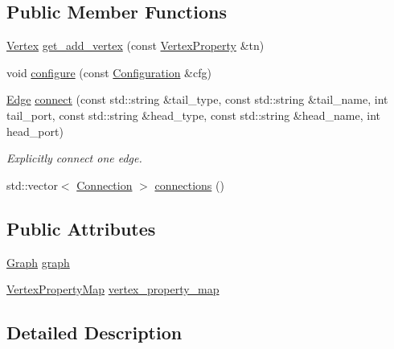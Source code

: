 \subsection*{Public Member Functions}
\begin{DoxyCompactItemize}
\item 
\hyperlink{struct_wire_cell_1_1_dfp_graph_a2f38c4e60540b0b3e530b7b8588f7725}{Vertex} \hyperlink{struct_wire_cell_1_1_dfp_graph_abb2159fd44adc3a08ad127f9ee71c92b}{get\+\_\+add\+\_\+vertex} (const \hyperlink{struct_wire_cell_1_1_dfp_graph_1_1_vertex_property}{Vertex\+Property} \&tn)
\item 
void \hyperlink{struct_wire_cell_1_1_dfp_graph_aa618fc26a6380c93e382a23c64612e77}{configure} (const \hyperlink{namespace_wire_cell_a9f705541fc1d46c608b3d32c182333ee}{Configuration} \&cfg)
\item 
\hyperlink{struct_wire_cell_1_1_dfp_graph_af3fc4fb6130bbad095ffe90480d59998}{Edge} \hyperlink{struct_wire_cell_1_1_dfp_graph_af4a13a365021fdaf75e8aa699bc7262f}{connect} (const std\+::string \&tail\+\_\+type, const std\+::string \&tail\+\_\+name, int tail\+\_\+port, const std\+::string \&head\+\_\+type, const std\+::string \&head\+\_\+name, int head\+\_\+port)
\begin{DoxyCompactList}\small\item\em Explicitly connect one edge. \end{DoxyCompactList}\item 
std\+::vector$<$ \hyperlink{struct_wire_cell_1_1_dfp_graph_a2411a46952a0b08b986e57ce0100ce21}{Connection} $>$ \hyperlink{struct_wire_cell_1_1_dfp_graph_ae88aaad51c4b745653f97e5452048d74}{connections} ()
\end{DoxyCompactItemize}
\subsection*{Public Attributes}
\begin{DoxyCompactItemize}
\item 
\hyperlink{struct_wire_cell_1_1_dfp_graph_ad5dd2546b355a72f5f24e90a985a45e9}{Graph} \hyperlink{struct_wire_cell_1_1_dfp_graph_ab74af213f84aa4a942ec7327c24ac04f}{graph}
\item 
\hyperlink{struct_wire_cell_1_1_dfp_graph_a3908c3dc81685f845df6243825cc6021}{Vertex\+Property\+Map} \hyperlink{struct_wire_cell_1_1_dfp_graph_aab5d8374b32287d34d0d7226014f3958}{vertex\+\_\+property\+\_\+map}
\end{DoxyCompactItemize}


\subsection{Detailed Description}



